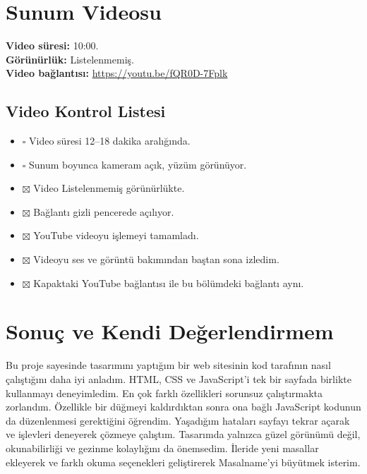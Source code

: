\documentclass[10pt,a4paper]{article}
\begin{document}
\section{Sunum Videosu}
\textbf{Video süresi:} 10:00.\\
\textbf{Görünürlük:} Listelenmemiş.\\
\textbf{Video bağlantısı:} \url{https://youtu.be/fQR0D-7Fplk}
\subsection{Video Kontrol Listesi}
\begin{itemize}[leftmargin=*]
\item $\square$ Video süresi 12--18 dakika aralığında.
\item $\square$ Sunum boyunca kameram açık, yüzüm görünüyor.
\item $\boxtimes$ Video Listelenmemiş görünürlükte.
\item $\boxtimes$ Bağlantı gizli pencerede açılıyor.
\item $\boxtimes$ YouTube videoyu işlemeyi tamamladı.
\item $\boxtimes$ Videoyu ses ve görüntü bakımından baştan sona izledim.
\item $\boxtimes$ Kapaktaki YouTube bağlantısı ile bu bölümdeki bağlantı aynı.
\end{itemize}
\section{Sonuç ve Kendi Değerlendirmem}
Bu proje sayesinde tasarımını yaptığım bir web sitesinin kod tarafının nasıl çalıştığını daha iyi anladım. HTML, CSS ve JavaScript'i tek bir sayfada birlikte kullanmayı deneyimledim. En çok farklı özellikleri sorunsuz çalıştırmakta zorlandım. Özellikle bir düğmeyi kaldırdıktan sonra ona bağlı JavaScript kodunun da düzenlenmesi gerektiğini öğrendim. Yaşadığım hataları sayfayı tekrar açarak ve işlevleri deneyerek çözmeye çalıştım. Tasarımda yalnızca güzel görünümü değil, okunabilirliği ve gezinme kolaylığını da önemsedim. İleride yeni masallar ekleyerek ve farklı okuma seçenekleri geliştirerek Masalname'yi büyütmek isterim.
\end{document}
